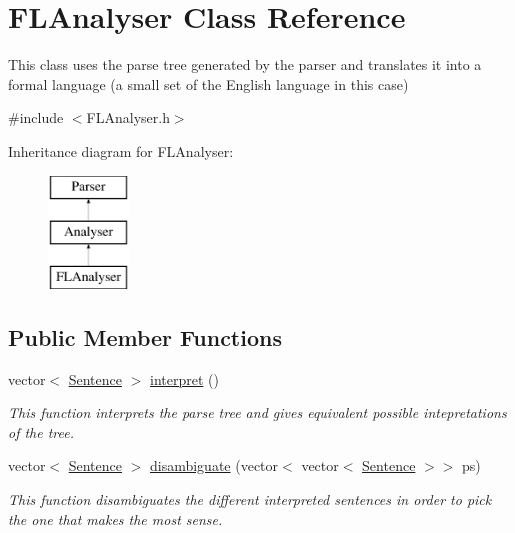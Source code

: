 \hypertarget{classFLAnalyser}{}\section{F\+L\+Analyser Class Reference}
\label{classFLAnalyser}


This class uses the parse tree generated by the parser and translates it into a formal language (a small set of the English language in this case)  




{\ttfamily \#include $<$F\+L\+Analyser.\+h$>$}

Inheritance diagram for F\+L\+Analyser\+:\begin{figure}[H]
\begin{center}
\leavevmode
\includegraphics[height=3.000000cm]{classFLAnalyser}
\end{center}
\end{figure}
\subsection*{Public Member Functions}
\begin{DoxyCompactItemize}
\item 
vector$<$ \mbox{\hyperlink{classSentence}{Sentence}} $>$ \mbox{\hyperlink{classFLAnalyser_a5ed65a6b9033106c9b6ca5c6a7b8e45f}{interpret}} ()
\begin{DoxyCompactList}\small\item\em This function interprets the parse tree and gives equivalent possible intepretations of the tree. \end{DoxyCompactList}\item 
vector$<$ \mbox{\hyperlink{classSentence}{Sentence}} $>$ \mbox{\hyperlink{classFLAnalyser_ac842959db593592a80f3e2e8508c22c1}{disambiguate}} (vector$<$ vector$<$ \mbox{\hyperlink{classSentence}{Sentence}} $>$$>$ ps)
\begin{DoxyCompactList}\small\item\em This function disambiguates the different interpreted sentences in order to pick the one that makes the most sense. \end{DoxyCompactList}\end{DoxyCompactItemize}

